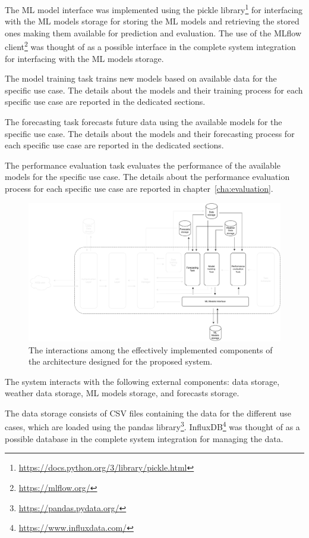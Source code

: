 The ML model interface was implemented using the pickle library\footnote{ \url{https://docs.python.org/3/library/pickle.html} } for interfacing with the ML models storage for storing the ML models and retrieving the stored ones making them available for prediction and evaluation.
The use of the MLflow client\footnote{ \url{https://mlflow.org/} } was thought of as a possible interface in the complete system integration for interfacing with the ML models storage.

The model training task trains new models based on available data for the specific use case.
The details about the models and their training process for each specific use case are reported in the dedicated sections.

The forecasting task forecasts future data using the available models for the specific use case.
The details about the models and their forecasting process for each specific use case are reported in the dedicated sections.

The performance evaluation task evaluates the performance of the available models for the specific use case.
The details about the performance evaluation process for each specific use case are reported in chapter~\ref{cha:evaluation}.

\begin{figure}[H]
\centering
\includegraphics[width=1\textwidth]{images/implementation_interactions}
\caption{The interactions among the effectively implemented components of the architecture designed for the proposed system.}
\label{fig:implementationinteractions}
\end{figure}

The system interacts with the following external components: data storage, weather data storage, ML models storage, and forecasts storage.

The data storage consists of CSV files containing the data for the different use cases, which are loaded using the pandas library\footnote{ \url{https://pandas.pydata.org/} }.
InfluxDB\footnote{ \url{https://www.influxdata.com/} } was thought of as a possible database in the complete system integration for managing the data.

